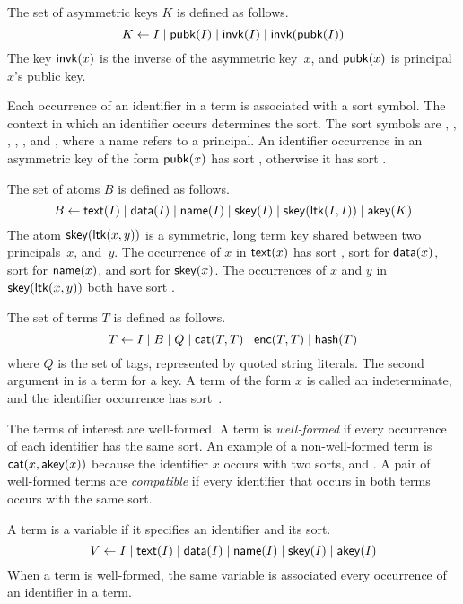 \documentclass[12pt]{report}
\theoremstyle{definition}
\begin{document}
The set of asymmetric keys $K$ is defined as follows.
$$ K \leftarrow I \mid \operatorname{\mathsf{pubk}}(I) \mid \operatorname{\mathsf{invk}}(I) \mid
\operatorname{\mathsf{invk}}(\operatorname{\mathsf{pubk}}(I)) $$ The key $\operatorname{\mathsf{invk}}(x)$ is the inverse of
the asymmetric key~$x$, and $\operatorname{\mathsf{pubk}}(x)$ is principal $x$'s public
key.

Each occurrence of an identifier in a term is associated with a sort
symbol.  The context in which an identifier occurs determines the
sort.  The sort symbols are , , ,
, , and , where a name refers to a
principal.  An identifier occurrence in an asymmetric key of the form
$\operatorname{\mathsf{pubk}}(x)$ has sort , otherwise it has sort .

The set of atoms $B$ is defined as follows.
$$ B \leftarrow \operatorname{\mathsf{text}}(I) \mid \operatorname{\mathsf{data}}(I) \mid \operatorname{\mathsf{name}}(I) \mid
\operatorname{\mathsf{skey}}(I)\mid \operatorname{\mathsf{skey}}(\operatorname{\mathsf{ltk}}(I, I)) \mid \operatorname{\mathsf{akey}}(K) $$ The
atom $\operatorname{\mathsf{skey}}(\operatorname{\mathsf{ltk}}(x, y))$ is a symmetric, long term key
shared between two principals~$x$, and~$y$.  The occurrence of $x$ in
$\operatorname{\mathsf{text}}(x)$ has sort , sort  for
$\operatorname{\mathsf{data}}(x)$, sort  for $\operatorname{\mathsf{name}}(x)$, and sort
 for $\operatorname{\mathsf{skey}}(x)$.  The occurrences of $x$ and $y$ in
$\operatorname{\mathsf{skey}}(\operatorname{\mathsf{ltk}}(x,y))$ both have sort .

The set of terms $T$ is defined as follows.
$$ T \leftarrow I \mid B \mid Q \mid \operatorname{\mathsf{cat}}(T, T) \mid \operatorname{\mathsf{enc}}(T,
T) \mid \operatorname{\mathsf{hash}}(T)$$ where $Q$ is the set of tags, represented by
quoted string literals.  The second argument in  is a term for
a key.  A term of the form $x$ is called an indeterminate, and the
identifier occurrence has sort~.

The terms of interest are well-formed.  A term
is \emph{well-formed} if every occurrence of each identifier has the
same sort.  An example of a non-well-formed term is
$\operatorname{\mathsf{cat}}(x,\operatorname{\mathsf{akey}}(x))$ because the identifier $x$ occurs with two
sorts,  and .  A pair of well-formed terms are
\emph{compatible} if every identifier that
occurs in both terms occurs with the same sort.

A term is a variable if it specifies an identifier and its sort.
$$ V \leftarrow I \mid \operatorname{\mathsf{text}}(I)  \mid \operatorname{\mathsf{data}}(I) \mid \operatorname{\mathsf{name}}(I) \mid
\operatorname{\mathsf{skey}}(I)\mid \operatorname{\mathsf{akey}}(I) $$ When a term is well-formed, the same
variable is associated every occurrence of an identifier in a term.
\end{document}
